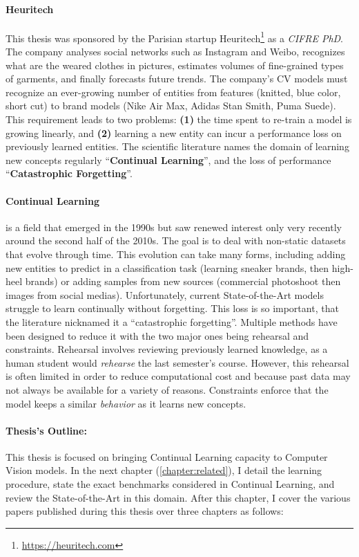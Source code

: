 \paragraph{Heuritech} This thesis was sponsored by the Parisian startup
Heuritech\footnote{\url{https://heuritech.com}} as a \textit{CIFRE PhD}. The company analyses social
networks such as Instagram and Weibo, recognizes what are the weared clothes in pictures, estimates
volumes of fine-grained types of garments, and finally forecasts future trends. The company's
\acf{CV} models must recognize an ever-growing number of entities from features (\eg knitted, blue
color, short cut) to brand models (\eg Nike Air Max, Adidas Stan Smith, Puma Suede). This
requirement leads to two problems: \textbf{(1)} the time spent to re-train a model is growing
linearly, and \textbf{(2)} learning a new entity can incur a performance loss on previously learned
entities. The scientific literature names the domain of learning new concepts regularly
``\textbf{Continual Learning}'', and the loss of performance ``\textbf{Catastrophic Forgetting}''.

\paragraph{Continual Learning} is a field that emerged in the 1990s but saw renewed interest only
very recently around the second half of the 2010s. The goal is to deal with non-static datasets that
evolve through time. This evolution can take many forms, including adding new entities to predict in
a classification task (\eg learning sneaker brands, then high-heel brands) or adding samples from
new sources (\eg commercial photoshoot then images from social medias). Unfortunately, current
State-of-the-Art models struggle to learn continually without forgetting. This loss is so important,
that the literature nicknamed it a ``catastrophic forgetting''. Multiple methods have been designed
to reduce it with the two major ones being rehearsal and constraints. Rehearsal involves reviewing
previously learned knowledge, as a human student would \textit{rehearse} the last semester's course.
However, this rehearsal is often limited in order to reduce computational cost and because past data
may not always be available for a variety of reasons. Constraints enforce that the model keeps a
similar \textit{behavior} as it learns new concepts.

\paragraph{Thesis's Outline:} This thesis is focused on bringing Continual Learning capacity to
Computer Vision models. In the next chapter (\autoref{chapter:related}), I detail the learning
procedure, state the exact benchmarks considered in Continual Learning, and review the
State-of-the-Art in this domain. After this chapter, I cover the various papers published during
this thesis over three chapters as follows:

